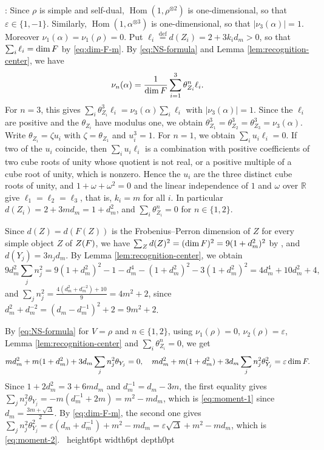 \documentclass[leqno]{article}
\let\cal\relax
\newcommand{\cal}{\mathcal}
\newcommand{\qed}{\hfill \vrule height6pt  width6pt depth0pt}
\newcommand{\ot}{\otimes}
\newcommand{\ov}{\overset}
\newcommand{\epsi}{\varepsilon}
\newenvironment{proof}[1][]{\noindent {\it Proof #1} : }{\hbox{~}\qed
\smallskip
}
\numberwithin{equation}{section}
\begin{document}
\begin{proof}
Since $\rho$ is simple and self-dual, $\operatorname{Hom}(1,\rho^{\ot 2})$ is one-dimensional, so that $\epsi \in \{1,-1\}$. Similarly, $\operatorname{Hom}(1,\alpha^{\ot 3})$ is one-dimensional, so that $|\nu_3(\alpha)| = 1$. Moreover $\nu_1(\alpha) = \nu_1(\rho) = 0$. Put $\ell_i \ov{\mathrm{def}}{=} d(Z_i) = 2+3k_i d_m > 0$, so that $\sum_i \ell_i = \dim\cal F$ by \eqref{eq:dim-F-m}. By \eqref{eq:NS-formula} and Lemma \ref{lem:recognition-center}, we have
\[
\nu_n(\alpha) = \frac{1}{\dim\cal F}\sum_{i=1}^3 \theta_{Z_i}^n \ell_i.
\]
For $n = 3$, this gives $\sum_i \theta_{Z_i}^3\ell_i = \nu_3(\alpha)\sum_i \ell_i$ with $|\nu_3(\alpha)| = 1$. Since the $\ell_i$ are positive and the $\theta_{Z_i}$ have modulus one, we obtain $\theta_{Z_1}^3 = \theta_{Z_2}^3 = \theta_{Z_3}^3 = \nu_3(\alpha)$. Write $\theta_{Z_i} = \zeta u_i$ with $\zeta = \theta_{Z_1}$ and $u_i^3 = 1$. For $n = 1$, we obtain $\sum_i u_i\ell_i = 0$. If two of the $u_i$ coincide, then $\sum_i u_i\ell_i$ is a combination with positive coefficients of two cube roots of unity whose quotient is not real, or a positive multiple of a cube root of unity, which is nonzero. Hence the $u_i$ are the three distinct cube roots of unity, and $1+\omega+\omega^2 = 0$ and the linear independence of $1$ and $\omega$ over $\mathbb{R}$ give $\ell_1 = \ell_2 = \ell_3$, that is, $k_i = m$ for all $i$. In particular $d(Z_i) = 2+3m d_m = 1+d_m^2$, and $\sum_i\theta_{Z_i}^n = 0$ for $n \in \{1,2\}$.

Since $d(Z) = d(F(Z))$ is the Frobenius--Perron dimension of $Z$ for every simple object $Z$ of $Z(\cal F)$, we have $\sum_Z d(Z)^2 = (\dim\cal F)^2 = 9(1+d_m^2)^2$ by \cite[Proposition 8.12 p.~32]{ENO05}, and $d(Y_j) = 3n_j d_m$. By Lemma \ref{lem:recognition-center}, we obtain
\[
9d_m^2\sum_j n_j^2 = 9(1+d_m^2)^2-1-d_m^4-(1+d_m^2)^2-3(1+d_m^2)^2 = 4d_m^4+10d_m^2+4,
\]
and $\sum_j n_j^2 = \frac{4(d_m^2+d_m^{-2})+10}{9} = 4m^2+2$, since $d_m^2+d_m^{-2} = (d_m-d_m^{-1})^2+2 = 9m^2+2$.

By \eqref{eq:NS-formula} for $V = \rho$ and $n \in \{1,2\}$, using $\nu_1(\rho) = 0$, $\nu_2(\rho) = \epsi$, Lemma \ref{lem:recognition-center} and $\sum_i\theta_{Z_i}^n = 0$, we get
\[
m d_m^2+m(1+d_m^2)+3d_m\sum_j n_j^2\theta_{Y_j} = 0,\quad m d_m^2+m(1+d_m^2)+3d_m\sum_j n_j^2\theta_{Y_j}^2 = \epsi\dim\cal F.
\]
Since $1+2d_m^2 = 3+6m d_m$ and $d_m^{-1} = d_m-3m$, the first equality gives $\sum_j n_j^2\theta_{Y_j} = -m(d_m^{-1}+2m) = m^2-m d_m$, which is \eqref{eq:moment-1} since $d_m = \frac{3m+\sqrt\Delta}{2}$. By \eqref{eq:dim-F-m}, the second one gives $\sum_j n_j^2\theta_{Y_j}^2 = \epsi(d_m+d_m^{-1})+m^2-m d_m = \epsi\sqrt\Delta+m^2-m d_m$, which is \eqref{eq:moment-2}.
\end{proof}
\end{document}
